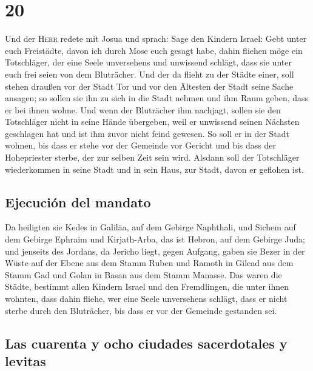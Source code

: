 \hypertarget{section-19}{%
\section{20}\label{section-19}}

 Und der \textsc{Herr} redete mit Josua und sprach:
 Sage den Kindern Israel: Gebt unter euch Freistädte,
davon ich durch Mose euch gesagt habe,  dahin fliehen möge
ein Totschläger, der eine Seele unversehens und unwissend schlägt, dass
sie unter euch frei seien von dem Bluträcher.  Und der da
flieht zu der Städte einer, soll stehen draußen vor der Stadt Tor und
vor den Ältesten der Stadt seine Sache ansagen; so sollen sie ihn zu
sich in die Stadt nehmen und ihm Raum geben, dass er bei ihnen wohne.
 Und wenn der Bluträcher ihm nachjagt, sollen sie den
Totschläger nicht in seine Hände übergeben, weil er unwissend seinen
Nächsten geschlagen hat und ist ihm zuvor nicht feind gewesen.
 So soll er in der Stadt wohnen, bis dass er stehe vor der
Gemeinde vor Gericht und bis dass der Hohepriester sterbe, der zur
selben Zeit sein wird. Alsdann soll der Totschläger wiederkommen in
seine Stadt und in sein Haus, zur Stadt, davon er geflohen ist.

\hypertarget{ejecuciuxf3n-del-mandato}{%
\subsection{Ejecución del mandato}\label{ejecuciuxf3n-del-mandato}}

 Da heiligten sie Kedes in Galiläa, auf dem Gebirge
Naphthali, und Sichem auf dem Gebirge Ephraim und Kirjath-Arba, das ist
Hebron, auf dem Gebirge Juda;  und jenseits des Jordans,
da Jericho liegt, gegen Aufgang, gaben sie Bezer in der Wüste auf der
Ebene aus dem Stamm Ruben und Ramoth in Gilead aus dem Stamm Gad und
Golan in Basan aus dem Stamm Manasse.  Das waren die
Städte, bestimmt allen Kindern Israel und den Fremdlingen, die unter
ihnen wohnten, dass dahin fliehe, wer eine Seele unversehens schlägt,
dass er nicht sterbe durch den Bluträcher, bis dass er vor der Gemeinde
gestanden sei.

\hypertarget{las-cuarenta-y-ocho-ciudades-sacerdotales-y-levitas}{%
\subsection{Las cuarenta y ocho ciudades sacerdotales y
levitas}\label{las-cuarenta-y-ocho-ciudades-sacerdotales-y-levitas}}

